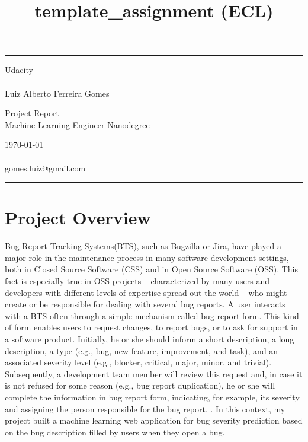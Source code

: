 \documentclass[a4paper]{article}
\begin{document}
\title{template_assignment (ECL)}
\fancyhead[C]{}
\hrule \medskip 
\begin{minipage}{0.295\textwidth}
\raggedright
Udacity\\ 
\footnotesize 
\hfill\\
Luiz Alberto Ferreira Gomes
\end{minipage}
\begin{minipage}{0.4\textwidth} 
\centering 
\large 
Project Report\\ 
\normalsize 
Machine Learning Engineer Nanodegree\\ 
\end{minipage}
\begin{minipage}{0.295\textwidth} 
\raggedleft
\today\\ 
\footnotesize 
\hfill\\
gomes.luiz@gmail.com 
\end{minipage}
\medskip\hrule 
\bigskip

\section{Project Overview}
Bug Report Tracking Systems(BTS), such as Bugzilla or Jira, have played a major role in the maintenance process in many software development settings, both in Closed Source Software (CSS) and in Open Source Software (OSS). This fact is especially true in OSS projects -- characterized by many users and developers with different levels of expertise spread out the world -- who might create or be responsible for dealing with several bug reports. A user interacts with a BTS often through a simple mechanism called bug report form\cite{Tian:2012}. This kind of form enables users to request changes, to report bugs, or to ask for support in a software product. Initially, he or she should inform a short description, a long description, a type (e.g., bug, new feature, improvement, and task), and an associated severity level (e.g., blocker, critical, major, minor, and trivial). Subsequently, a development team member will review this request and, in case it is not refused for some reason (e.g., bug report duplication), he or she will complete the information in bug report form, indicating, for example, its severity and assigning the person responsible for the bug report. \cite{Cavalcanti:2014}. In this context, my project built a machine learning web application for bug severity prediction based on the bug description filled by users when they open a bug.
\end{document}
